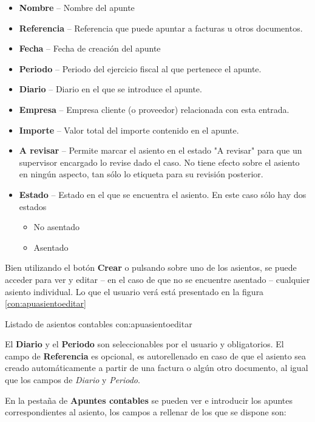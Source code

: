 \begin{itemize}
  \item \textbf{Nombre} -- Nombre del apunte
  \item \textbf{Referencia} -- Referencia que puede apuntar a facturas u otros documentos.
  \item \textbf{Fecha} -- Fecha de creación del apunte
  \item \textbf{Periodo} -- Periodo del ejercicio fiscal al que pertenece el apunte.
  \item \textbf{Diario} -- Diario en el que se introduce el apunte.
  \item \textbf{Empresa} -- Empresa cliente (o proveedor) relacionada con esta entrada.
  \item \textbf{Importe} -- Valor total del importe contenido en el apunte.
  \item \textbf{A revisar} -- Permite marcar el asiento en el estado "A revisar" para que un supervisor encargado lo revise dado el caso.
                            No tiene efecto sobre el asiento en ningún aspecto, tan sólo lo etiqueta para su revisión posterior.
  \item \textbf{Estado} -- Estado en el que se encuentra el asiento. En este caso sólo hay dos estados
     \begin{itemize}
       \item No asentado
       \item Asentado
     \end{itemize}
\end{itemize}

Bien utilizando el botón \textbf{Crear} o pulsando sobre uno de los asientos, se puede acceder para ver y editar -- en el caso de que no se encuentre asentado -- cualquier asiento individual. Lo que el usuario verá está presentado en la figura  \ref{con:apuasientoeditar}

{Listado de asientos contables}
{con:apuasientoeditar}

El \textbf{Diario} y el \textbf{Periodo} son seleccionables por el usuario y obligatorios. El campo de \textbf{Referencia} es opcional, es autorellenado en caso de que el asiento sea creado automáticamente a partir de una factura o algún otro documento, al igual que los campos de \emph{Diario} y \emph{Periodo}.

En la pestaña de \textbf{Apuntes contables} se pueden ver e introducir los apuntes correspondientes al asiento, los campos a rellenar de los que se dispone son:

